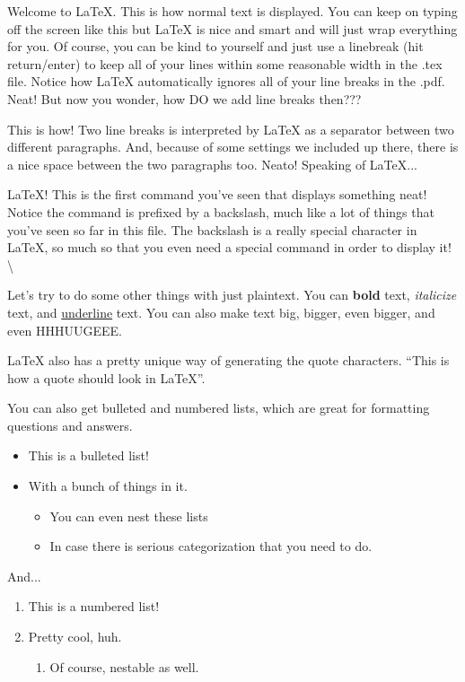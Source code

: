 \documentclass{article}
\begin{document}
\thispagestyle{firstpage}

Welcome to LaTeX. This is how normal text is displayed. You can keep on typing off the screen like this but LaTeX is nice and smart and will just wrap everything for you. Of course, you
can be kind to yourself and just use a linebreak (hit return/enter) to keep
all of your lines within some reasonable width in the .tex file. Notice how
LaTeX automatically ignores all of your line breaks in the .pdf. Neat! But now
you wonder, how DO we add line breaks then???

This is how! Two line breaks is interpreted by LaTeX as a separator between two
different paragraphs. And, because of some settings we included up there, there
is a nice space between the two paragraphs too. Neato! Speaking of LaTeX...

\LaTeX! This is the first command you've seen that displays something neat!
Notice the command is prefixed by a backslash, much like a lot of things that
you've seen so far in this file. The backslash is a really special character in
\LaTeX, so much so that you even need a special command in order to display
it! \textbackslash{}

Let's try to do some other things with just plaintext. You can \textbf{bold}
text, \textit{italicize} text, and \underline{underline} text. You can also
make text {\large big}, {\Large bigger}, even {\LARGE bigger}, and even
{\Huge HHHUUGEEE}.

\LaTeX{} \@ also has a pretty unique way of generating the quote characters.
``This is how a quote should look in LaTeX''.

You can also get bulleted and numbered lists, which are great for formatting
questions and answers.
\begin{itemize}
  \item This is a bulleted list!
  \item With a bunch of things in it.
  \begin{itemize}
    \item You can even nest these lists
    \item In case there is serious categorization that you need to do.
  \end{itemize}
\end{itemize}

And...

\begin{enumerate}
  \item This is a numbered list!
  \item Pretty cool, huh.
  \begin{enumerate}
    \item Of course, nestable as well.
  \end{enumerate}
\end{enumerate}
\end{document}
